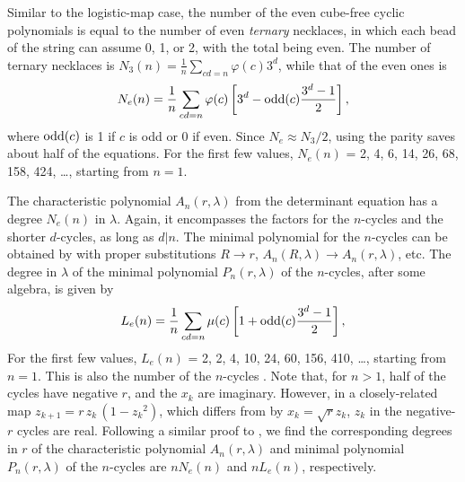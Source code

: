 \documentclass{ws-ijbc}
\begin{document}
Similar to the logistic-map case,
the number of the even cube-free cyclic polynomials
is equal to the number of even \emph{ternary} necklaces,
in which each bead of the string can assume
0, 1, or 2, with the total being even.
%
The number of ternary necklaces is
$N_3(n) = \frac{1}{n} \sum_{c d = n} \varphi(c) 3^d$,
while that of the even ones is
\begin{equation}
  N_e(n) = \frac{1}{n} \sum_{c d = n} \varphi(c)
    \left[
      3^d - \mathrm{odd}(c) \frac{3^d-1}{2}
    \right],
\label{eq:cubnecklace}
\end{equation}
where
$\mathrm{odd}(c)$ %
is 1 if $c$ is odd or 0 if even.
%
Since $N_e \approx N_3/2$, using the parity saves about half of the equations.
%
For the first few values, $N_e(n)$ = 2, 4, 6, 14, 26, 68, 158, 424, \dots, starting from $n = 1$.
%



The characteristic polynomial $A_n(r, \lambda)$
  from the determinant equation
  has a degree $N_e(n)$ in $\lambda$.
Again, it encompasses the factors for the $n$-cycles
  and the shorter $d$-cycles, as long as $d|n$.
The minimal polynomial for the $n$-cycles can be obtained
  by  with proper substitutions
  $R\rightarrow r$,
    $A_n(R, \lambda) \rightarrow A_n(r, \lambda)$,
    etc.
The degree in $\lambda$ of
the minimal polynomial $P_n(r, \lambda)$ of the $n$-cycles,
  after some algebra,
  is given by
%
%
\begin{equation}
  L_e(n) = \frac{1}{n} \sum_{cd = n} \mu(c)
    \left[
      1 + \mathrm{odd}(c)\frac{3^d-1}{2}
    \right],
\label{eq:cublyndon}
\end{equation}
%
%
For the first few values,
  $L_e(n)$ = 2, 2, 4, 10, 24, 60, 156, 410, \ldots, starting from $n = 1$.
%
This is also the number of the $n$-cycles \cite{hao, hao2}.
Note that, for $n>1$, half of the cycles have negative $r$,
and the $x_k$ are imaginary.
However, in a closely-related map
$z_{k+1} = r \, z_k \, (1 - {z_k}^2)$,
which differs from  by $x_k = \sqrt{r} z_k$,
$z_k$ in the negative-$r$ cycles are real.
%
%
Following a similar proof to ,
we find the corresponding degrees in $r$
of the characteristic polynomial $A_n(r, \lambda)$
  and minimal polynomial $P_n(r, \lambda)$ of the $n$-cycles
are $n N_e(n)$ and $n L_e(n)$, respectively.
\end{document}
